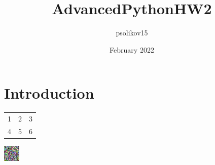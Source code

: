 \documentclass{article}
\title{AdvancedPythonHW2}
\author{psolikov15 }
\date{February 2022}
\begin{document}
\maketitle

\section{Introduction}
\begin{center}
\begin{tabular}{ |c|c|c| }
 \hline
 1 & 2 & 3  \\ 4 & 5 & 6  \\ 
 \hline
\end{tabular}
\end{center}

\includegraphics{lala}
\end{document}
